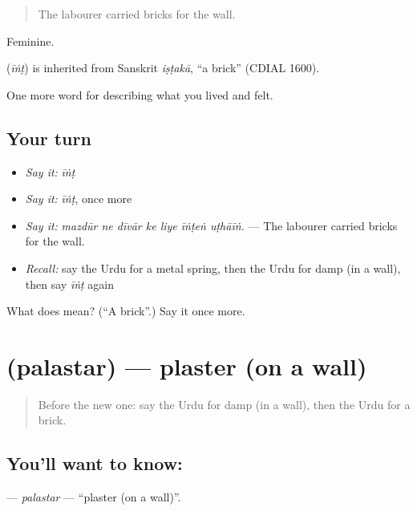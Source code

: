 \begin{quote}
The labourer carried bricks for the wall.
\end{quote}

Feminine.

\begin{cousinweb}
\textbf{} (\emph{īṅṭ}) is inherited from Sanskrit \emph{iṣṭakā}, \textquotedblleft{}a brick\textquotedblright{} (CDIAL 1600).
\end{cousinweb}

\begin{grammarlens}[title={What you've built}]
One more word for describing what you lived and felt.
\end{grammarlens}

\subsection*{Your turn}
\begin{itemize}
\raggedright
  \item \emph{Say it:} \emph{īṅṭ}
  \item \emph{Say it:} \emph{īṅṭ}, once more
  \item \emph{Say it:} \emph{mazdūr ne dīvār ke liye īṅṭeṅ uṭhāīṅ.} — The labourer carried bricks for the wall.
  \item \emph{Recall:} say the Urdu for a metal spring, then the Urdu for damp (in a wall), then say \emph{īṅṭ} again
\end{itemize}

\begin{tcolorbox}[breakable,colback=teal!4,colframe=teal!35!black,title={Before you move on}]
What does  mean? (\textquotedblleft{}A brick\textquotedblright{}.) Say it once more.
\end{tcolorbox}
\section[\texorpdfstring{\ur{پلستر} (palastar)}{پلستر (palastar)}]{ (palastar) — plaster (on a wall)}

\label{lesson:UR-C503-palastar}



\begin{quote}
Before the new one: say the Urdu for damp (in a wall), then the Urdu for a brick.
\end{quote}

\subsection*{You'll want to know: }
\textbf{} — \emph{palastar} — \textquotedblleft{}plaster (on a wall)\textquotedblright{}.

